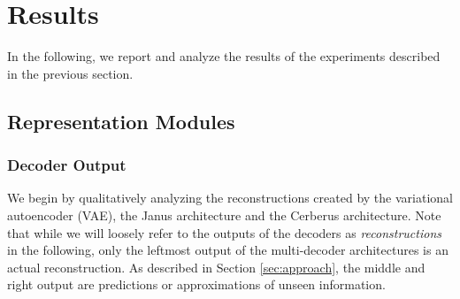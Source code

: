 \section{Results}
\label{sec:results}

In the following, we report and analyze the results of the experiments described in the previous section. 

\subsection{Representation Modules}

\subsubsection{Decoder Output}
We begin by qualitatively analyzing the reconstructions created by the variational autoencoder (VAE), the Janus architecture and the Cerberus architecture. Note that while we will loosely refer to the outputs of the decoders as \textit{reconstructions} in the following, only the leftmost output of the multi-decoder architectures is an actual reconstruction. As described in Section \ref{sec:approach}, the middle and right output are predictions or approximations of unseen information.

